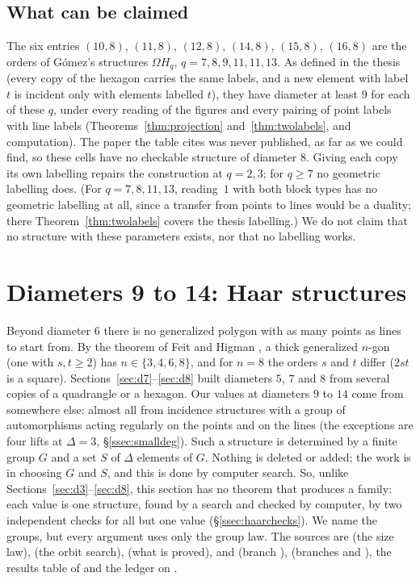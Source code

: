 \documentclass[11pt]{amsart}
\theoremstyle{definition}
\theoremstyle{remark}
\begin{document}
\subsection{What can be claimed}\label{ssec:omegaclaim}
The six entries $(10,8)$, $(11,8)$, $(12,8)$, $(14,8)$, $(15,8)$, $(16,8)$ are the orders of G\'omez's structures $\Omega H_q$, $q=7,8,9,11,11,13$. As defined in the thesis (every copy of the hexagon carries the same labels, and a new element with label $t$ is incident only with elements labelled $t$), they have diameter at least $9$ for each of these $q$, under every reading of the figures and every pairing of point labels with line labels (Theorems~\ref{thm:projection} and~\ref{thm:twolabels}, and computation). The paper the table cites was never published, as far as we could find, so these cells have no checkable structure of diameter $8$. Giving each copy its own labelling repairs the construction at $q=2,3$; for $q\ge7$ no geometric labelling does. (For $q=7,8,11,13$, reading~$1$ with both block types has no geometric labelling at all, since a transfer from points to lines would be a duality; there Theorem~\ref{thm:twolabels} covers the thesis labelling.) We do not claim that no structure with these parameters exists, nor that no labelling works.

\section{Diameters 9 to 14: Haar structures}\label{sec:haar}

Beyond diameter $6$ there is no generalized polygon with as many points as lines to start from. By the theorem of Feit and Higman \cite{FH64}, a thick generalized $n$-gon (one with $s,t\ge2$) has $n\in\{3,4,6,8\}$, and for $n=8$ the orders $s$ and $t$ differ ($2st$ is a square). Sections~\ref{sec:d7}--\ref{sec:d8} built diameters $5$, $7$ and $8$ from several copies of a quadrangle or a hexagon. Our values at diameters $9$ to $14$ come from somewhere else: almost all from incidence structures with a group of automorphisms acting regularly on the points and on the lines (the exceptions are four lifts at $\Delta=3$, \S\ref{ssec:smalldeg}). Such a structure is determined by a finite group $G$ and a set $S$ of $\Delta$ elements of $G$. Nothing is deleted or added; the work is in choosing $G$ and $S$, and this is done by computer search. So, unlike Sections~\ref{sec:d3}--\ref{sec:d8}, this section has no theorem that produces a family: each value is one structure, found by a search and checked by computer, by two independent checks for all but one value (\S\ref{ssec:haarchecks}). We name the groups, but every argument uses only the group law. The sources are  (the size law),  (the orbit search),  (what is proved),  and  (branch ),  (branches  and ), the results table of  and the ledger  on .
\end{document}
